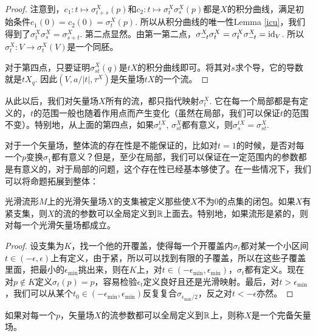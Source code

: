\begin{proof}
注意到，$c_1:t\mapsto \sigma_{t+s}^X(p)$和$c_2:t\mapsto \sigma^X_t\sigma^X_s(p)$都是$X$的积分曲线，满足初始条件$c_1(0)=c_2(0)=\sigma_{t}^X(p)$. 所以从积分曲线的唯一性Lemma \ref{icu}，我们得到了$\sigma^X_t\sigma^X_s=\sigma^X_{s+t}$. 第二点显然。由第一第二点，$\sigma^X_{-t}\sigma^X_{t}=\sigma^X_{t}\sigma^X_{-t}=\operatorname{id}_V$. 所以$\sigma^X_t:V\to \sigma^X_t(V)$是一个同胚。

对于第四点，只要证明$\sigma^X_{st}(q)$是$tX$的积分曲线即可。将其对$s$求个导，它的导数就是$tX_q$. 因此$(V,a/|t|,\tau^X)$是矢量场$tX$的一个流。
\end{proof}

从此以后，我们对矢量场$X$所有的流，都只指代映射$\sigma^X_t$. 它在每一个局部都是有定义的，$t$的范围一般也随着作用点而产生变化（虽然在局部，我们可以保证$t$的范围不变）。特别地，从上面的第四点，如果$\sigma^{tX}_s$, $\sigma^{X}_{st}$都有意义，则$\sigma^{tX}_s=\sigma^{X}_{st}$.

对于一个矢量场，整体流的存在性是不能保证的，比如对$t=1$的时候，是否对每一个$p$变换$\sigma_1$都有意义？但是，至少在局部，我们可以保证在一定范围内的参数都是有意义的，对于局部的问题，这个存在性已经基本够使了。在一些情况下，我们可以将命题拓展到整体：

\begin{pro}
光滑流形$M$上的光滑矢量场$X$的支集被定义那些使$X$不为$0$的点集的闭包。如果$X$有紧支集，则$X$的流的参数可以全局定义到$\mathbb{R}$上面去。特别地，如果流形是紧的，则对每一个光滑矢量场都成立。
\end{pro}

\begin{proof}
设支集为$K$，找一个他的开覆盖，使得每一个开覆盖内$\sigma_t$都对某一个小区间$t\in (-\epsilon,\epsilon)$上有定义，由于紧，所以可以找到有限的子覆盖，所以在这些子覆盖里面，把最小的$\epsilon_{\text{min}}$挑出来，则在$K$上，对$t\in(-\epsilon_{\text{min}},\epsilon_{\text{min}})$，$\sigma_t$都有定义。现在对$p\notin K$定义$\sigma_t(p)=p$，容易检验$\epsilon_t$定义良好且还是光滑映射。最后，对$t>\epsilon_{\text{min}}$，我们可以从某个$t_0\in (-\epsilon_{\text{min}},\epsilon_{\text{min}})$反复复合$\sigma_{\epsilon_{\text{min}}/2}$，反之对$t<-\epsilon$亦然。
\end{proof}

如果对每一个$p$，矢量场$X$的流参数都可以全局定义到$\mathbb{R}$上，则称$X$是一个完备矢量场。

